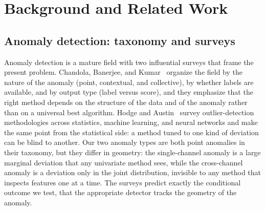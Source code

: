 \documentclass[journal]{IEEEtran}
\begin{document}
\section{Background and Related Work}

\subsection{Anomaly detection: taxonomy and surveys}
Anomaly detection is a mature field with two influential surveys that frame the present problem.
Chandola, Banerjee, and Kumar~\cite{chandola2009anomaly} organize the field by the nature of the
anomaly (point, contextual, and collective), by whether labels are available, and by output type
(label versus score), and they emphasize that the right method depends on the structure of the data
and of the anomaly rather than on a universal best algorithm. Hodge and Austin~\cite{hodge2004survey}
survey outlier-detection methodologies across statistics, machine learning, and neural networks and
make the same point from the statistical side: a method tuned to one kind of deviation can be blind
to another. Our two anomaly types are both point anomalies in their taxonomy, but they differ in
geometry: the single-channel anomaly is a large marginal deviation that any univariate method sees,
while the cross-channel anomaly is a deviation only in the joint distribution, invisible to any
method that inspects features one at a time. The surveys predict exactly the conditional outcome we
test, that the appropriate detector tracks the geometry of the anomaly.
\end{document}
